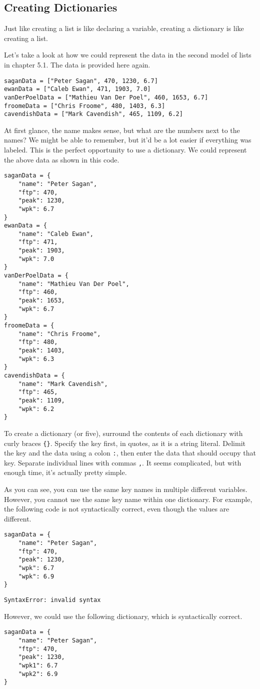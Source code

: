 \subsection{Creating Dictionaries}
Just like creating a list is like declaring a variable, creating a dictionary is like creating a list.\par
Let's take a look at how we could represent the data in the second model of lists in chapter 5.1. The data is provided here again.
\begin{lstlisting}[style=pippython]
saganData = ["Peter Sagan", 470, 1230, 6.7]
ewanData = ["Caleb Ewan", 471, 1903, 7.0]
vanDerPoelData = ["Mathieu Van Der Poel", 460, 1653, 6.7]
froomeData = ["Chris Froome", 480, 1403, 6.3]
cavendishData = ["Mark Cavendish", 465, 1109, 6.2]
\end{lstlisting}
At first glance, the name makes sense, but what are the numbers next to the names? We might be able to remember, but it'd be a lot easier if everything was labeled. This is the perfect opportunity to use a dictionary. We could represent the above data as shown in this code.
\begin{lstlisting}[style=pippython]
saganData = {
    "name": "Peter Sagan",
    "ftp": 470,
    "peak": 1230,
    "wpk": 6.7
}
ewanData = {
    "name": "Caleb Ewan",
    "ftp": 471,
    "peak": 1903,
    "wpk": 7.0
}
vanDerPoelData = {
    "name": "Mathieu Van Der Poel",
    "ftp": 460,
    "peak": 1653,
    "wpk": 6.7
}
froomeData = {
    "name": "Chris Froome",
    "ftp": 480,
    "peak": 1403,
    "wpk": 6.3
}
cavendishData = {
    "name": "Mark Cavendish",
    "ftp": 465,
    "peak": 1109,
    "wpk": 6.2
}
\end{lstlisting}
To create a dictionary (or five), surround the contents of each dictionary with curly braces \verb|{}|. Specify the key first, in quotes, as it is a string literal. Delimit the key and the data using a colon \verb|:|, then enter the data that should occupy that key. Separate individual lines with commas \verb|,|. It seems complicated, but with enough time, it's actually pretty simple.\par
As you can see, you can use the same key names in multiple different variables. However, you cannot use the same key name within one dictionary. For example, the following code is not syntactically correct, even though the values are different.
\begin{lstlisting}[style=pippython]
saganData = {
    "name": "Peter Sagan",
    "ftp": 470,
    "peak": 1230,
    "wpk": 6.7
    "wpk": 6.9
}
\end{lstlisting}
\begin{lstlisting}[style=none]
SyntaxError: invalid syntax
\end{lstlisting}
However, we could use the following dictionary, which is syntactically correct.
\begin{lstlisting}[style=pippython]
saganData = {
    "name": "Peter Sagan",
    "ftp": 470,
    "peak": 1230,
    "wpk1": 6.7
    "wpk2": 6.9
}
\end{lstlisting}
